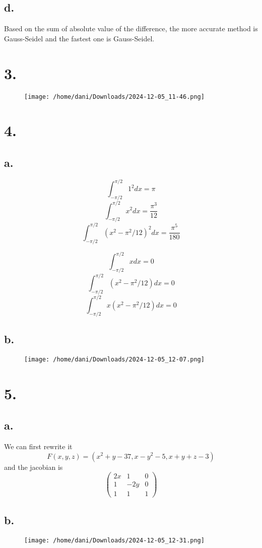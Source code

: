\documentclass[11pt]{article}
\theoremstyle{mystyle}
\theoremstyle{definition}
\begin{document}
\subsection*{d.}
Based on the sum of absolute value of the difference, the more accurate method is Gauss-Seidel and the fastest one is Gauss-Seidel.
\clearpage 
\section*{3.}

\begin{figure}[h]
  \centering
  \texttt{[image: /home/dani/Downloads/2024-12-05\_11-46.png]}
  \caption{}
  \label{fig:2024-12-05_11-46}
\end{figure}
\clearpage 
\section*{4.}
\subsection*{a.}
\[
  \int_{-\pi/2}^{\pi/2} 1^2 dx = \pi 
\]
\[
  \int_{-\pi/2}^{\pi/2} x^2 dx = \displaystyle\frac{\pi^3}{12} 
\]
\[
  \int_{-\pi/2}^{\pi/2} (x^2 - \pi^2/12)^2 dx = \displaystyle\frac{\pi^5}{180} 
\]

\[
  \int_{-\pi/2}^{\pi/2} x dx = 0 
\]
\[
  \int_{-\pi/2}^{\pi/2} (x^2 - \pi^2/12) dx = 0
\]
\[
  \int_{-\pi/2}^{\pi/2} x(x^2 - \pi^2/12) dx = 0 
\]
\subsection*{b.}

\begin{figure}[h]
  \centering
  \texttt{[image: /home/dani/Downloads/2024-12-05\_12-07.png]}
  \caption{}
  \label{fig:2024-12-05_12-07}
\end{figure}
\clearpage 
\section*{5.}
\subsection{a.}
We can first rewrite it 
\[
  F(x,y,z) = (x^2 + y-37, x-y^2-5,x+y+z-3)
\]
and the jacobian is 
\[
  \begin{pmatrix}
    2x & 1 & 0\\
    1 & -2y & 0\\
    1 & 1 & 1
  \end{pmatrix}
\]
\subsection*{b.}

\begin{figure}[h]
  \centering
  \texttt{[image: /home/dani/Downloads/2024-12-05\_12-31.png]}
  \caption{}
  \label{fig:2024-12-05_12-31}
\end{figure}
\end{document}
